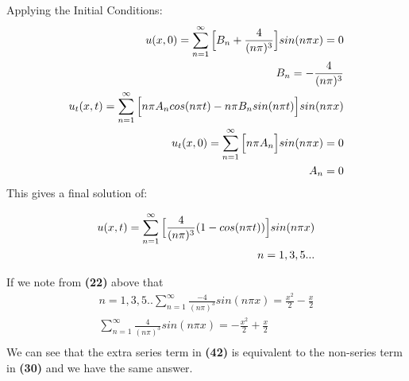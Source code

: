 \documentclass{article}
\begin{document}
Applying the Initial Conditions:
\begin{equation}
\begin{aligned}
u(x,0) = \sum_{n=1}^{\infty} \Big{[}B_n + \frac{4}{(n\pi)^3}\Big{]}sin(n\pi x) = 0\\
B_n = -\frac{4}{(n\pi)^3}\\
u_t(x,t) = \sum_{n=1}^{\infty} \Big{[} n\pi A_n cos(n\pi t) - n\pi B_n sin(n\pi t) \Big{]}sin(n\pi x)\\
u_t(x,0) = \sum_{n=1}^{\infty}\Big{[}n\pi A_n \Big{]}sin(n\pi x) = 0\\
A_n = 0
\end{aligned}
\end{equation}
This gives a final solution of:
\begin{tcolorbox}[minipage,colback=white,arc=0pt,outer arc=0pt]
\begin{equation}
\begin{aligned}
u(x,t) = \sum_{n=1}^{\infty} \Big{[} \frac{4}{(n\pi)^3}( 1- cos(n\pi t)) \Big{]}sin(n\pi x)\\
n = 1,3,5...
\end{aligned}
\end{equation}
\end{tcolorbox}
If we note from \textbf{(22)} above that 
\begin{equation}
\begin{aligned}
n = 1,3,5..
\sum_{n=1}^{\infty}\frac{-4}{(n\pi)^3}sin(n\pi x) = \frac{x^2}{2} - \frac{x}{2}\\
\sum_{n=1}^{\infty}\frac{4}{(n\pi)^3}sin(n\pi x) = -\frac{x^2}{2} +\frac{x}{2}\\
\end{aligned}
\end{equation}
We can see that the extra series term in \textbf{(42)} is equivalent to the non-series term in \textbf{(30)} and we have the same answer.
\end{document}
